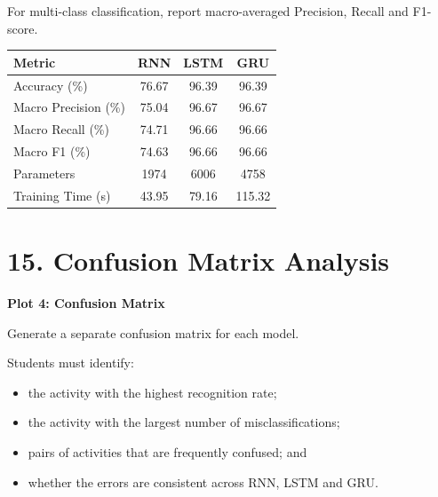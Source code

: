 \documentclass[10pt]{article}
\begin{document}
For multi-class classification, report macro-averaged Precision, Recall and
F1-score.


\begin{center}

\begin{tabular}{|l|c|c|c|}
\hline
\textbf{Metric} & \textbf{RNN} & \textbf{LSTM} & \textbf{GRU} \\
\hline
Accuracy (\%) & 76.67 & 96.39 & 96.39 \\
\hline
Macro Precision (\%) & 75.04 & 96.67 & 96.67 \\
\hline
Macro Recall (\%) & 74.71 & 96.66 & 96.66 \\
\hline
Macro F1 (\%) & 74.63 & 96.66 & 96.66 \\
\hline
Parameters & 1974 & 6006 & 4758 \\
\hline
Training Time (s) & 43.95 & 79.16 & 115.32 \\
\hline

\end{tabular}

\end{center}

\section*{15. Confusion Matrix Analysis}

\textbf{Plot 4: Confusion Matrix}

Generate a separate confusion matrix for each model.

Students must identify:

\begin{itemize}
\item the activity with the highest recognition rate;
\item the activity with the largest number of misclassifications;
\item pairs of activities that are frequently confused; and
\item whether the errors are consistent across RNN, LSTM and GRU.
\end{itemize}
\end{document}
